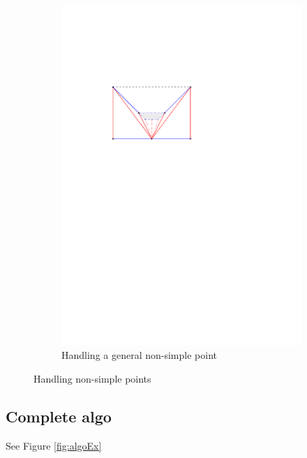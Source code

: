 \documentclass[a4paper]{article}
\theoremstyle{definition}
\begin{document}
\begin{figure}
\begin{subfigure}[b]{0.45\textwidth}
    \includegraphics[scale=0.8]{img/generalWalk}
        \caption{Handling a general non-simple point}
    \end{subfigure}

    	\caption{Handling non-simple points}
	\label{fig:E2}
\end{figure}



\subsection{Complete algo}
See Figure \ref{fig:algoEx}
\end{document}
